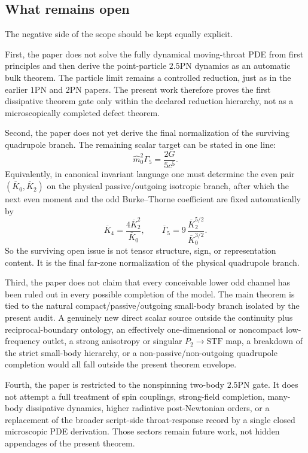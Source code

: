 \documentclass[11pt]{article}
\begin{document}
\subsection{What remains open}
\label{sec:conclusion-open}

The negative side of the scope should be kept equally explicit.

First, the paper does not solve the fully dynamical moving-throat PDE from first
principles and then derive the point-particle $2.5$PN dynamics as an automatic
bulk theorem.  The particle limit remains a controlled reduction, just as in the
earlier $1$PN and $2$PN papers.  The present work therefore proves the first
dissipative theorem gate only within the declared reduction hierarchy, not as a
microscopically completed defect theorem.

Second, the paper does not yet derive the final normalization of the surviving
quadrupole branch.  The remaining scalar target can be stated in one line:
\[
\boxed{
\hat m_0^2\Gamma_5=\frac{2G}{5c^5}.
}
\]
Equivalently, in canonical invariant language one must determine the even pair
$(\overline K_0,\overline K_2)$ on the physical passive/outgoing isotropic
branch, after which the next even moment and the odd Burke--Thorne coefficient
are fixed automatically by
\[
\overline K_4=\frac{4\overline K_2^2}{\overline K_0},
\qquad
\overline\Gamma_5
=9\,\frac{\overline K_2^{5/2}}{\overline K_0^{3/2}}.
\]
So the surviving open issue is not tensor structure, sign, or representation
content.  It is the final far-zone normalization of the physical quadrupole
branch.

Third, the paper does not claim that every conceivable lower odd channel has
been ruled out in every possible completion of the model.  The main theorem is
tied to the natural compact/passive/outgoing small-body branch isolated by the
present audit.  A genuinely new direct scalar source outside the continuity plus
reciprocal-boundary ontology, an effectively one-dimensional or noncompact
low-frequency outlet, a strong anisotropy or singular $P_2\to\mathrm{STF}$ map,
a breakdown of the strict small-body hierarchy, or a non-passive/non-outgoing
quadrupole completion would all fall outside the present theorem envelope.

Fourth, the paper is restricted to the nonspinning two-body $2.5$PN gate.  It
does not attempt a full treatment of spin couplings, strong-field completion,
many-body dissipative dynamics, higher radiative post-Newtonian orders, or a
replacement of the broader script-side throat-response record by a single closed
microscopic PDE derivation.  Those sectors remain future work, not hidden
appendages of the present theorem.
\end{document}
